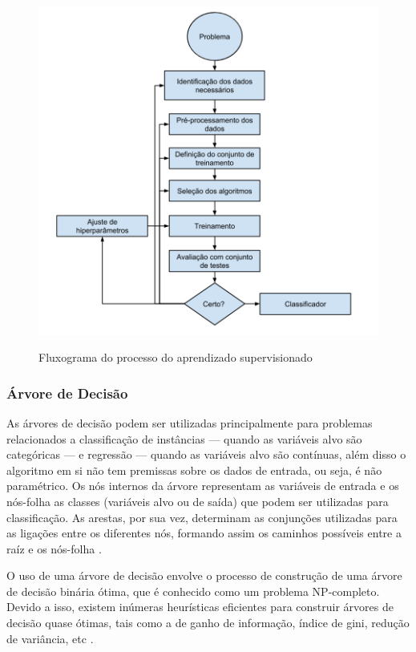 \documentclass[
	12pt,				%
	oneside,			%
	a4paper,			%
	english,			%
	brazil				%
	]{abntex2ppgsi}
\begin{document}
\begin{figure}[H]%
	\centering
 	  \caption{Fluxograma do processo do aprendizado supervisionado}
		\includegraphics[width=0.8\linewidth]{images/ml_arch_pt.png}
	\label{fig:arch_ml}
\end{figure}

\subsubsection{Árvore de Decisão}

As árvores de decisão podem ser utilizadas principalmente para problemas relacionados a classificação de instâncias --- quando as variáveis alvo são categóricas --- e regressão --- quando as variáveis alvo são contínuas, além disso o algoritmo em si não tem premissas sobre os dados de entrada, ou seja, é não paramétrico. Os nós internos da árvore representam as variáveis de entrada e os nós-folha as classes (variáveis alvo ou de saída) que podem ser utilizadas para classificação. As arestas, por sua vez, determinam as conjunções utilizadas para as ligações entre os diferentes nós, formando assim os caminhos possíveis entre a raíz e os nós-folha \cite{kotsiantis2007supervised}.

O uso de uma árvore de decisão envolve o processo de construção de uma árvore de decisão binária ótima, que é conhecido como um problema NP-completo. Devido a isso, existem inúmeras heurísticas eficientes para construir árvores de decisão quase ótimas, tais como a de ganho de informação, índice de gini, redução de variância, etc \cite{kotsiantis2007supervised}. 
\end{document}
